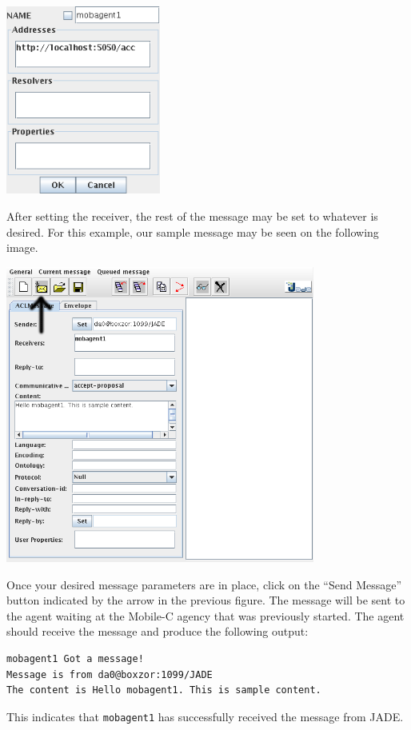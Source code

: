 \documentclass[11pt]{report}
\begin{document}
{\begin{center}
\includegraphics[width=2in]{figure/jade_to_mc_example/dummy_agent_receiver_window.png}
\end{center}

After setting the receiver, the rest of the message may be set to whatever is desired.
For this example, our sample message may be seen on the following image.

\begin{center}
\includegraphics[width=4in]{figure/jade_to_mc_example/dummy_agent_window_complete.png}
\end{center}

Once your desired message parameters are in place, click on the ``Send Message'' button
indicated by the arrow in the previous figure. The message will be sent to the agent
waiting at the Mobile-C agency that was previously started. The agent should
receive the message and produce the following output:
\begin{verbatim}
mobagent1 Got a message!
Message is from da0@boxzor:1099/JADE
The content is Hello mobagent1. This is sample content.
\end{verbatim}
This indicates that \texttt{mobagent1} has successfully received the
message from JADE.

}
\end{document}
